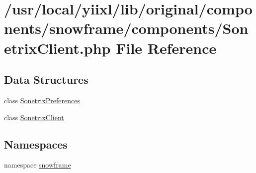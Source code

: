 \hypertarget{SonetrixClient_8php}{
\section{/usr/local/yiixl/lib/original/components/snowframe/components/SonetrixClient.php File Reference}
\label{SonetrixClient_8php}
}
\subsection*{Data Structures}
\begin{DoxyCompactItemize}
\item 
class \hyperlink{classSonetrixPreferences}{SonetrixPreferences}
\item 
class \hyperlink{classSonetrixClient}{SonetrixClient}
\end{DoxyCompactItemize}
\subsection*{Namespaces}
\begin{DoxyCompactItemize}
\item 
namespace \hyperlink{namespacesnowframe}{snowframe}
\end{DoxyCompactItemize}
